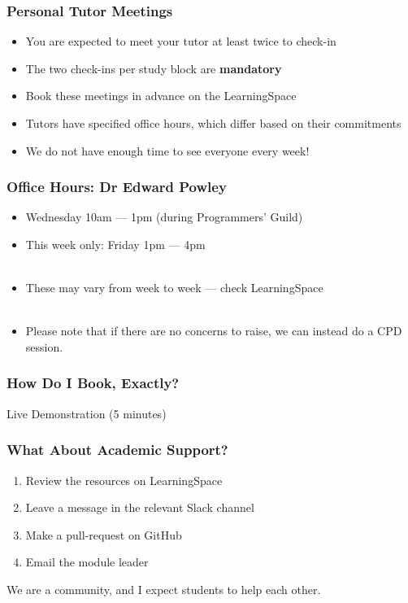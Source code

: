 \begin{frame}
	\frametitle{Personal Tutor Meetings}	
	\begin{itemize}
		\item You are expected to meet your tutor at least twice to check-in
		\item The two check-ins per study block are \textbf{mandatory}
		\item Book these meetings in advance on the LearningSpace
		
		\item Tutors have specified office hours, which differ based on their commitments
		\item We do not have enough time to see everyone every week! 
	\end{itemize}
\end{frame}

\begin{frame}
	\frametitle{Office Hours: Dr Edward Powley}	
	\begin{itemize}
		\item Wednesday 10am --- 1pm (during Programmers' Guild)
		\item This week only: Friday 1pm --- 4pm
		\\~\\
		\item These may vary from week to week --- check LearningSpace
		\\~\\
		\item Please note that if there are no concerns to raise, we can instead do a CPD session.
	\end{itemize}
\end{frame}

\begin{frame}
	\frametitle{How Do I Book, Exactly?}	
	\begin{center}
		Live Demonstration (5 minutes)
	\end{center}
\end{frame}

\begin{frame}
	\frametitle{What About Academic Support?}	
	\begin{enumerate}
		\item Review the resources on LearningSpace
		\item Leave a message in the relevant Slack channel
		\item Make a pull-request on GitHub
		\item Email the module leader
	\end{enumerate}
	
	We are a community, and I expect students to help each other.
\end{frame}

